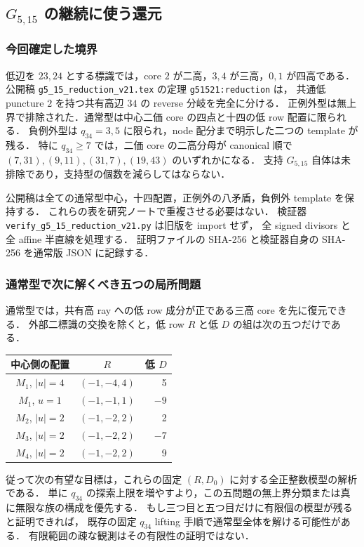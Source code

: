 \subsection{\texorpdfstring{$G_{5,15}$}{G5,15} の継続に使う還元}
\label{ng51521:section}

\subsubsection{今回確定した境界}

低辺を $23,24$ とする標識では，core $2$ が二高，$3,4$ が三高，$0,1$ が四高である．
公開稿 \nolinkurl{g5_15_reduction_v21.tex} の定理 \texttt{g51521:reduction} は，
共通低 puncture $2$ を持つ共有高辺 $34$ の reverse 分岐を完全に分ける．
正例外型は無上界で排除された．通常型は中心二価 core の四点と十四の低 row 配置に限られる．
負例外型は $q_{34}=3,5$ に限られ，node 配分まで明示した二つの template が残る．
特に $q_{34}\ge7$ では，二価 core の二高分母が canonical 順で
$(7,31),(9,11),(31,7),(19,43)$ のいずれかになる．
支持 $G_{5,15}$ 自体は未排除であり，支持型の個数を減らしてはならない．

公開稿は全ての通常型中心，十四配置，正例外の八矛盾，負例外 template を保持する．
これらの表を研究ノートで重複させる必要はない．
検証器 \nolinkurl{verify_g5_15_reduction_v21.py} は旧版を import せず，
全 signed divisors と全 affine 半直線を処理する．
証明ファイルの SHA-256 と検証器自身の SHA-256 を通常版 JSON に記録する．

\subsubsection{通常型で次に解くべき五つの局所問題}

通常型では，共有高 ray への低 row 成分が正である三高 core を先に復元できる．
外部二標識の交換を除くと，低 row $R$ と低 $D$ の組は次の五つだけである．
\begin{center}\small
\begin{tabular}{c|c|r}
中心側の配置&$R$&低 $D$\\\hline
$M_1$, $|u|=4$&$(-1,-4,4)$&5\\
$M_1$, $u=1$&$(-1,-1,1)$&$-9$\\
$M_2$, $|u|=2$&$(-1,-2,2)$&2\\
$M_3$, $|u|=2$&$(-1,-2,2)$&$-7$\\
$M_4$, $|u|=2$&$(-1,-2,2)$&9
\end{tabular}
\end{center}
従って次の有望な目標は，これらの固定 $(R,D_0)$ に対する全正整数模型の解析である．
単に $q_{34}$ の探索上限を増やすより，この五問題の無上界分類または真に無限な族の構成を優先する．
もし三つ目と五つ目だけに有限個の模型が残ると証明できれば，
既存の固定 $q_{34}$ lifting 手順で通常型全体を解ける可能性がある．
有限範囲の疎な観測はその有限性の証明ではない．

